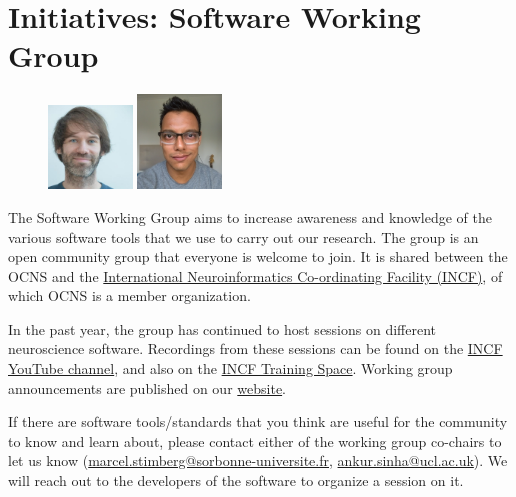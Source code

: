 \documentclass[11pt,a4paper,oneside]{article}
\begin{document}
\clearpage
\section*{Initiatives: Software Working Group}%
\begin{figure}
  \includegraphics[width=0.2\textwidth]{images/marcel}
  \includegraphics[width=0.2\textwidth]{images/ankur-sinha}
\end{figure}

The Software Working Group aims to increase awareness and knowledge of the various software tools that we use to carry out our research.
The group is an open community group that everyone is welcome to join.
It is shared between the OCNS and the \href{https://incf.org}{International Neuroinformatics Co-ordinating Facility (INCF)}, of which OCNS is a member organization.

In the past year, the group has continued to host sessions on different neuroscience software.
Recordings from these sessions can be found on the \href{https://www.youtube.com/@IncfOrg_INCF/videos}{INCF YouTube channel}, and also on the \href{https://training.incf.org/course/incfocns-working-group-computational-neuroscience-software}{INCF Training Space}.
Working group announcements are published on our \href{https://ocns.github.io/SoftwareWG/}{website}.

If there are software tools/standards that you think are useful for the community to know and learn about, please contact either of the working group co-chairs to let us know (\href{mailto:marcel.stimberg@sorbonne-universite.fr}{marcel.stimberg@sorbonne-universite.fr}, \href{mailto:ankur.sinha@ucl.ac.uk}{ankur.sinha@ucl.ac.uk}).
We will reach out to the developers of the software to organize a session on it.
\end{document}

